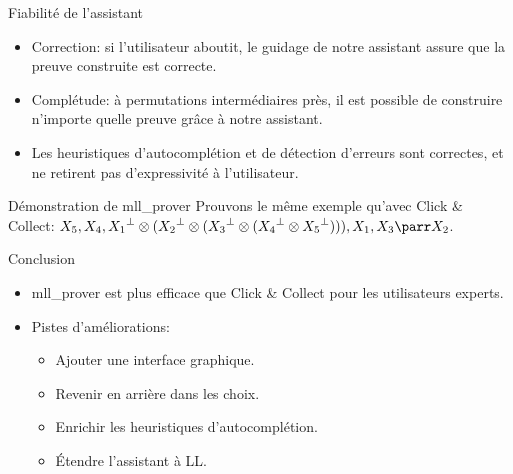\documentclass{beamer}
\newcommand*{\orth}{^\perp}
\newcommand*{\tensor}{\otimes}
\begin{document}
\begin{frame}{Fiabilité de l'assistant}
    \begin{itemize}
        \item Correction: si l'utilisateur aboutit, le guidage de notre assistant assure que la preuve construite est correcte.
        \item Complétude: à permutations intermédiaires près, il est possible de construire n'importe quelle preuve grâce à notre assistant.
            \pause
        \item Les heuristiques d'autocomplétion et de détection d'erreurs sont correctes, et ne retirent pas d'expressivité à l'utilisateur.
    \end{itemize}
\end{frame}

\begin{frame}{Démonstration de mll\_prover}
    Prouvons le même exemple qu'avec Click \& Collect: $X_5, X_4, {X_1}\orth \tensor ({X_2}\orth \tensor ({X_3}\orth \tensor ({X_4}\orth \tensor {X_5}\orth))), X_1, X_3 \parr X_2$.
\end{frame}

\begin{frame}{Conclusion}
    \begin{itemize}
        \item mll\_prover est plus efficace que Click \& Collect pour les utilisateurs experts.
            \pause
        \item Pistes d'améliorations:
            \begin{itemize}
                \item Ajouter une interface graphique.
                \item Revenir en arrière dans les choix.
                \item Enrichir les heuristiques d'autocomplétion.
                \item Étendre l'assistant à LL.
            \end{itemize}
    \end{itemize}
\end{frame}
\end{document}
